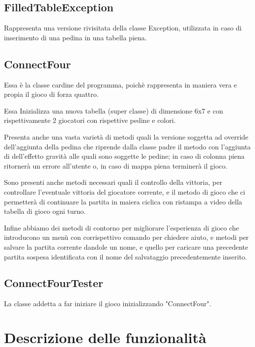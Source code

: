 \documentclass{article}
\begin{document}
\subsection{FilledTableException}
Rappresenta una versione rivisitata della classe Exception, utilizzata in caso di inserimento di una pedina in una tabella piena.


\subsection{ConnectFour}
Essa è la classe cardine del programma, poichè rappresenta in maniera vera e propia il gioco di forza quattro.

Essa Inizializza una nuova tabella (super classe) di dimensione 6x7 e con rispettivamente 2 giocatori con rispettive pedine e colori.

Presenta anche una vasta varietà di metodi quali la versione soggetta ad override dell'aggiunta della pedina che riprende dalla classe padre il metodo con l'aggiunta di dell'effetto gravità alle quali sono soggette le pedine; in caso di colonna piena ritornerà un errore all'utente o, in caso di mappa piena terminerà il gioco.

Sono presenti anche metodi necessari quali il controllo della vittoria, per controllare l'eventuale vittoria del giocatore corrente, e il metodo di gioco che ci permetterà di continuare la partita in maiera ciclica con ristampa a video della tabella di gioco ogni turno.

Infine abbiamo dei metodi di contorno per migliorare l'esperienza di gioco che introducono un menù con corrispettivo comando per chiedere aiuto, e metodi per salvare la partita corrente dandole un nome, e quello per caricare una precedente partita sospesa identificata con il nome del salvataggio precedentemente inserito.

\subsection{ConnectFourTester}
La classe addetta a far iniziare il gioco inizializzando "ConnectFour".


\section{Descrizione delle funzionalità}
\end{document}

